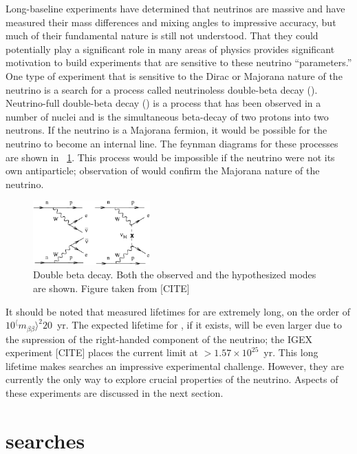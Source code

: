 Long-baseline experiments have determined that neutrinos are massive and have measured their mass differences and mixing angles to impressive accuracy, but much of their fundamental nature is still not understood.  That they could potentially play a significant role in many areas of physics provides significant motivation to build experiments that are sensitive to these neutrino ``parameters.'' One type of experiment that is sensitive to the Dirac or Majorana nature of the neutrino is a search for a process called neutrinoless double-beta decay (\zvbb).  Neutrino-full double-beta decay (\tvbb) is a process that has been observed in a number of nuclei and is the simultaneous beta-decay of two protons into two neutrons.  If the neutrino is a Majorana fermion, it would be possible for the neutrino to become an internal line.  The feynman diagrams for these processes are shown in {\fig}~\ref{fig:zvbb}.  This process would be impossible if the neutrino were not its own antiparticle; observation of \zvbb would confirm the Majorana nature of the neutrino. 
\begin{figure}[htp]
\centering
\includegraphics[width=0.4\textwidth]{figures/feynman2.eps}
\caption{Double beta decay.  Both the observed \tvbb and the hypothesized \zvbb modes are shown.  Figure taken from [CITE]}
\label{fig:zvbb}
\end{figure}
It should be noted that measured lifetimes for \tvbb are extremely long, on the order of $10^{\langle}m_{\beta\beta}{\rangle}^2{20}$~yr.  The expected lifetime for \zvbb, if it exists, will be even larger due to the supression of the right-handed component of the neutrino; the IGEX experiment [CITE] places the current limit at $>1.57\times 10^{25}$~yr.  This long lifetime makes \zvbb searches an impressive experimental challenge.  However, they are currently the only way to explore crucial properties of the neutrino.  Aspects of these experiments are discussed in the next section.

\section{\zvbb searches}

